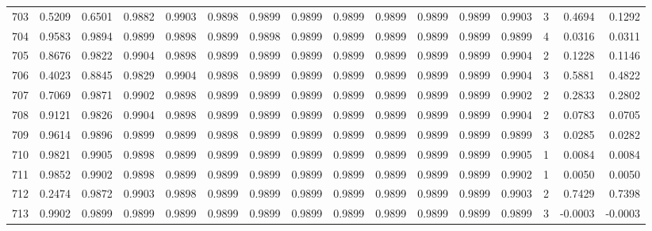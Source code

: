 \begin{tabular}{lrrrrrrrrrrrrrrr}
703 &      0.5209 &  0.6501 &  0.9882 &  0.9903 &  0.9898 &  0.9899 &  0.9899 &  0.9899 &  0.9899 &  0.9899 &   0.9899 &     0.9903 &      3 &                    0.4694 &                     0.1292 \\
704 &      0.9583 &  0.9894 &  0.9899 &  0.9898 &  0.9899 &  0.9898 &  0.9899 &  0.9899 &  0.9899 &  0.9899 &   0.9899 &     0.9899 &      4 &                    0.0316 &                     0.0311 \\
705 &      0.8676 &  0.9822 &  0.9904 &  0.9898 &  0.9899 &  0.9899 &  0.9899 &  0.9899 &  0.9899 &  0.9899 &   0.9899 &     0.9904 &      2 &                    0.1228 &                     0.1146 \\
706 &      0.4023 &  0.8845 &  0.9829 &  0.9904 &  0.9898 &  0.9899 &  0.9899 &  0.9899 &  0.9899 &  0.9899 &   0.9899 &     0.9904 &      3 &                    0.5881 &                     0.4822 \\
707 &      0.7069 &  0.9871 &  0.9902 &  0.9898 &  0.9899 &  0.9899 &  0.9899 &  0.9899 &  0.9899 &  0.9899 &   0.9899 &     0.9902 &      2 &                    0.2833 &                     0.2802 \\
708 &      0.9121 &  0.9826 &  0.9904 &  0.9898 &  0.9899 &  0.9899 &  0.9899 &  0.9899 &  0.9899 &  0.9899 &   0.9899 &     0.9904 &      2 &                    0.0783 &                     0.0705 \\
709 &      0.9614 &  0.9896 &  0.9899 &  0.9899 &  0.9898 &  0.9899 &  0.9899 &  0.9899 &  0.9899 &  0.9899 &   0.9899 &     0.9899 &      3 &                    0.0285 &                     0.0282 \\
710 &      0.9821 &  0.9905 &  0.9898 &  0.9899 &  0.9899 &  0.9899 &  0.9899 &  0.9899 &  0.9899 &  0.9899 &   0.9899 &     0.9905 &      1 &                    0.0084 &                     0.0084 \\
711 &      0.9852 &  0.9902 &  0.9898 &  0.9899 &  0.9899 &  0.9899 &  0.9899 &  0.9899 &  0.9899 &  0.9899 &   0.9899 &     0.9902 &      1 &                    0.0050 &                     0.0050 \\
712 &      0.2474 &  0.9872 &  0.9903 &  0.9898 &  0.9899 &  0.9899 &  0.9899 &  0.9899 &  0.9899 &  0.9899 &   0.9899 &     0.9903 &      2 &                    0.7429 &                     0.7398 \\
713 &      0.9902 &  0.9899 &  0.9899 &  0.9899 &  0.9899 &  0.9899 &  0.9899 &  0.9899 &  0.9899 &  0.9899 &   0.9899 &     0.9899 &      3 &                   -0.0003 &                    -0.0003 \\

\end{tabular}
